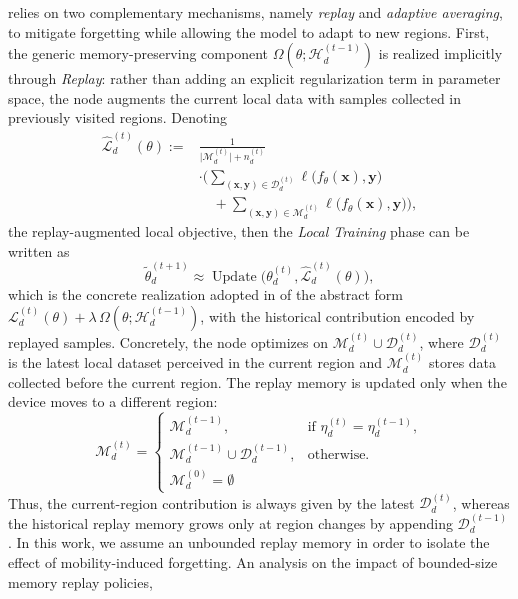 \documentclass[conference]{IEEEtran}
\theoremstyle{plain}
\theoremstyle{definition}
\begin{document}
\approach{} relies on two complementary mechanisms, namely \emph{replay} and \emph{adaptive averaging}, to mitigate forgetting while allowing the model to adapt to new regions.
First, 
the generic memory-preserving component $\Omega(\theta;\mathcal{H}_d^{(t-1)})$ is realized implicitly through \emph{Replay}: 
rather than adding an explicit regularization term in parameter space, the node augments the current local data with samples collected in previously visited regions.
Denoting
\[
\begin{aligned}
    \widehat{\mathcal{L}}_d^{(t)}(\theta)
    := &
    \frac{1}{\lvert\mathcal{M}_d^{(t)}\rvert + n_d^{(t)}} \\
    & \cdot \Biggl(
        \sum_{(\mathbf{x},\mathbf{y}) \in \mathcal{D}_d^{(t)}} \ell\bigl(f_\theta(\mathbf{x}), \mathbf{y}\bigr) \\
        & \quad + \sum_{(\mathbf{x},\mathbf{y}) \in \mathcal{M}_d^{(t)}} \ell\bigl(f_\theta(\mathbf{x}), \mathbf{y}\bigr)
    \Biggr),
\end{aligned}
\]
the replay-augmented local objective, then the \emph{Local Training} phase can be written as
\[
    \widetilde{\theta}_d^{(t+1)}
    \approx
    \operatorname{Update}\!\bigl(\theta_d^{(t)}, \widehat{\mathcal{L}}_d^{(t)}(\theta)\bigr),
\]
which is the concrete realization adopted in \approach{} of the abstract form
$\mathcal{L}_d^{(t)}(\theta) + \lambda\,\Omega(\theta;\mathcal{H}_d^{(t-1)})$, 
with the historical contribution encoded by replayed samples.
Concretely, the node optimizes on $\mathcal{M}_d^{(t)} \cup \mathcal{D}_d^{(t)}$, 
 where $\mathcal{D}_d^{(t)}$ is the latest local dataset perceived in the current region and $\mathcal{M}_d^{(t)}$ stores data collected before the current region. 
 The replay memory is updated only when the device moves to a different region:
\[
    \mathcal{M}_d^{(t)}
    =
    \begin{cases}
        \mathcal{M}_d^{(t-1)}, & \text{if } \eta_d^{(t)} = \eta_d^{(t-1)}, \\
        \mathcal{M}_d^{(t-1)} \cup \mathcal{D}_d^{(t-1)}, & \text{otherwise.} \\
        \mathcal{M}_d^{(0)} = \emptyset
    \end{cases}
\]
Thus, the current-region contribution is always given by the latest $\mathcal{D}_d^{(t)}$, 
 whereas the historical replay memory grows only at region changes by appending $\mathcal{D}_d^{(t-1)}$.
In this work, we assume an unbounded replay memory in order to isolate the effect 
of mobility-induced forgetting. An analysis on the impact of bounded-size memory replay policies, 
\end{document}
